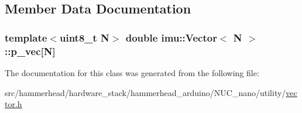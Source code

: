 \subsection{Member Data Documentation}
\subsubsection[{\texorpdfstring{p\+\_\+vec}{p_vec}}]{\setlength{\rightskip}{0pt plus 5cm}template$<$uint8\+\_\+t N$>$ double {\bf imu\+::\+Vector}$<$ N $>$\+::p\+\_\+vec\mbox{[}N\mbox{]}\hspace{0.3cm}{\ttfamily [private]}}\hypertarget{classimu_1_1Vector_a76580c2032af73e52bdd4326dc034dac}{}\label{classimu_1_1Vector_a76580c2032af73e52bdd4326dc034dac}


The documentation for this class was generated from the following file\+:\begin{DoxyCompactItemize}
\item 
src/hammerhead/hardware\+\_\+stack/hammerhead\+\_\+arduino/\+N\+U\+C\+\_\+nano/utility/\hyperlink{vector_8h}{vector.\+h}\end{DoxyCompactItemize}
